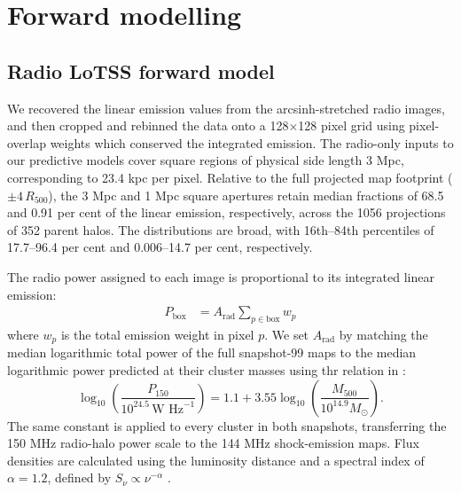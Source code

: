 \section{Forward modelling}
\label{sec:fwd}

\subsection{Radio LoTSS forward model}

We recovered the linear emission values from the arcsinh-stretched radio images, and then cropped and rebinned the data onto a 128$\times$128 pixel grid using pixel-overlap weights which conserved the integrated emission.
The radio-only inputs to our predictive models cover square regions of physical side length 3 Mpc, corresponding to 23.4 kpc per pixel.
Relative to the full projected map footprint ($\pm4\,R_{500}$), the 3 Mpc and 1 Mpc square apertures retain median fractions of 68.5 and 0.91 per cent of the linear emission, respectively, across the 1056 projections of 352 parent halos.
The distributions are broad, with 16th--84th percentiles of 17.7--96.4 per cent and 0.006--14.7 per cent, respectively.

The radio power assigned to each image is proportional to its integrated linear emission:
\begin{align*}
    P_\text{box}
    &= A_\text{rad} \sum_{p \in \text{box}} w_p
\end{align*}
where $w_p$ is the total emission weight in pixel $p$.
We set $A_\text{rad}$ by matching the median logarithmic total power of the full snapshot-99 maps to the median logarithmic power predicted at their cluster masses using thr relation in \cite{Cuciti2023}:
\begin{equation}\label{eq:power-relation}
    \log_{10} \! \left( \frac{P_{150}}{10^{24.5}\, \text{W Hz}^{-1}} \right)
    = 1.1 + 3.55 \log_{10}\! \left( \frac{M_{500}}{10^{14.9} M_\odot} \right).
\end{equation}
The same constant is applied to every cluster in both snapshots, transferring the 150 MHz radio-halo power scale to the 144 MHz shock-emission maps.
Flux densities are calculated using the luminosity distance and a spectral index of $\alpha = 1.2$, defined by $S_\nu \propto \nu^{-\alpha}$ \citep{Cuciti2023}.

